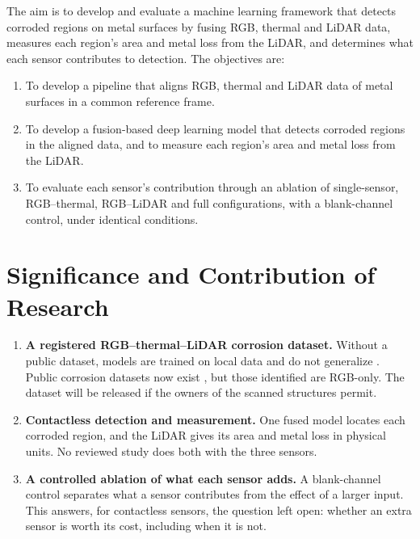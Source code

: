 The aim is to develop and evaluate a machine learning framework that detects
corroded regions on metal surfaces by fusing RGB, thermal and LiDAR data, measures
each region's area and metal loss from the LiDAR, and determines what each sensor
contributes to detection. The objectives are:

\begin{enumerate}[label=\arabic*),leftmargin=*,itemsep=6pt]
  \item To develop a pipeline that aligns RGB, thermal and LiDAR data of metal
        surfaces in a common reference frame.
  \item To develop a fusion-based deep learning model that detects corroded
        regions in the aligned data, and to measure each region's area and metal
        loss from the LiDAR.
  \item To evaluate each sensor's contribution through an ablation of
        single-sensor, RGB--thermal, RGB--LiDAR and full configurations, with a
        blank-channel control, under identical conditions.
\end{enumerate}

\section{Significance and Contribution of Research}
\label{sec:significance}

\begin{enumerate}[label=\arabic*),leftmargin=*,itemsep=5pt]
  \item \textbf{A registered RGB--thermal--LiDAR corrosion dataset.} Without a
        public dataset, models are trained on local data and do not generalize
        \citep{Nash2022}. Public corrosion datasets now exist
        \citep{Espinoza2026}, but those identified are RGB-only. The dataset will
        be released if the owners of the scanned structures permit.
  \item \textbf{Contactless detection and measurement.} One fused model locates
        each corroded region, and the LiDAR gives its area and metal loss in
        physical units. No reviewed study does both with the three sensors.
  \item \textbf{A controlled ablation of what each sensor adds.} A blank-channel
        control separates what a sensor contributes from the effect of a larger
        input. This answers, for contactless sensors, the question
        \citet{Haitz2022} left open: whether an extra sensor is worth its cost,
        including when it is not.
\end{enumerate}

